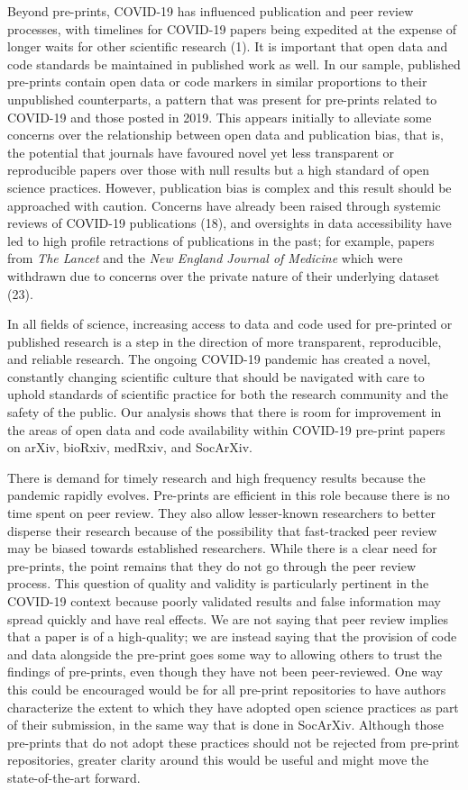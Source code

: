 \documentclass[
]{article}
\begin{document}
Beyond pre-prints, COVID-19 has influenced publication and peer review processes, with timelines for COVID-19 papers being expedited at the expense of longer waits for other scientific research (1). It is important that open data and code standards be maintained in published work as well. In our sample, published pre-prints contain open data or code markers in similar proportions to their unpublished counterparts, a pattern that was present for pre-prints related to COVID-19 and those posted in 2019. This appears initially to alleviate some concerns over the relationship between open data and publication bias, that is, the potential that journals have favoured novel yet less transparent or reproducible papers over those with null results but a high standard of open science practices. However, publication bias is complex and this result should be approached with caution. Concerns have already been raised through systemic reviews of COVID-19 publications (18), and oversights in data accessibility have led to high profile retractions of publications in the past; for example, papers from \emph{The Lancet} and the \emph{New England Journal of Medicine} which were withdrawn due to concerns over the private nature of their underlying dataset (23).

In all fields of science, increasing access to data and code used for pre-printed or published research is a step in the direction of more transparent, reproducible, and reliable research. The ongoing COVID-19 pandemic has created a novel, constantly changing scientific culture that should be navigated with care to uphold standards of scientific practice for both the research community and the safety of the public. Our analysis shows that there is room for improvement in the areas of open data and code availability within COVID-19 pre-print papers on arXiv, bioRxiv, medRxiv, and SocArXiv.

There is demand for timely research and high frequency results because the pandemic rapidly evolves. Pre-prints are efficient in this role because there is no time spent on peer review. They also allow lesser-known researchers to better disperse their research because of the possibility that fast-tracked peer review may be biased towards established researchers. While there is a clear need for pre-prints, the point remains that they do not go through the peer review process. This question of quality and validity is particularly pertinent in the COVID-19 context because poorly validated results and false information may spread quickly and have real effects. We are not saying that peer review implies that a paper is of a high-quality; we are instead saying that the provision of code and data alongside the pre-print goes some way to allowing others to trust the findings of pre-prints, even though they have not been peer-reviewed. One way this could be encouraged would be for all pre-print repositories to have authors characterize the extent to which they have adopted open science practices as part of their submission, in the same way that is done in SocArXiv. Although those pre-prints that do not adopt these practices should not be rejected from pre-print repositories, greater clarity around this would be useful and might move the state-of-the-art forward.
\end{document}
